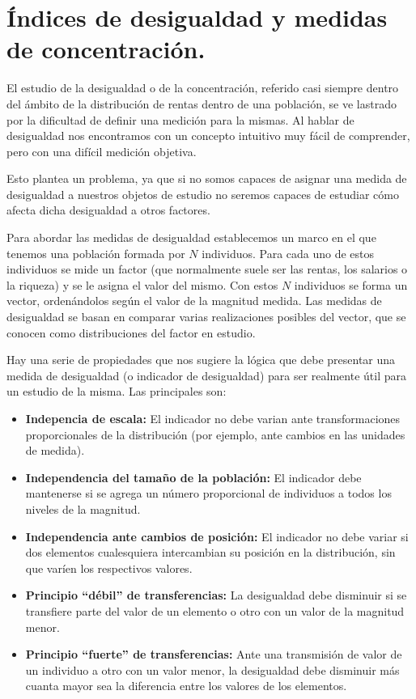 \chapter[\'Indices de desigualdad y medidas de concentraci\'on.]{\'Indices de desigualdad y medidas de concentraci\'on.}


El estudio de la desigualdad o de la concentraci\'on, referido casi siempre dentro del \'ambito de la distribuci\'on de rentas dentro de una poblaci\'on, se ve lastrado por la dificultad de definir una medici\'on para la mismas. Al hablar de desigualdad nos encontramos con un concepto intuitivo muy f\'acil de comprender, pero con una dif\'icil medici\'on objetiva.

Esto plantea un problema, ya que si no somos capaces de asignar una medida de desigualdad a nuestros objetos de estudio no seremos capaces de estudiar c\'omo afecta dicha desigualdad a otros factores.


Para abordar las medidas de desigualdad establecemos un marco en el que tenemos una poblaci\'on formada por $N$ individuos. Para cada uno de estos individuos se mide un factor (que normalmente suele ser las rentas, los salarios o la riqueza) y se le asigna el valor del mismo. Con estos $N$ individuos se forma un vector, orden\'andolos seg\'un el valor de la magnitud medida. Las medidas de desigualdad se basan en comparar varias realizaciones posibles del vector, que se conocen como distribuciones del factor en estudio.


Hay una serie de propiedades que nos sugiere la l\'ogica que debe presentar una medida de desigualdad (o indicador de desigualdad) para ser realmente \'util para un estudio de la misma. Las principales son:
\begin{itemize}
\item \textbf{Indepencia de escala:} El indicador no debe varian ante transformaciones proporcionales de la distribuci\'on (por ejemplo, ante cambios en las unidades de medida).
\item \textbf{Independencia del tama\~no de la poblaci\'on:} El indicador debe mantenerse si se agrega un n\'umero proporcional de individuos a todos los niveles de la magnitud.
\item \textbf{Independencia ante cambios de posici\'on:} El indicador no debe variar si dos elementos cualesquiera intercambian su posici\'on en la distribuci\'on, sin que var\'ien los respectivos valores.
\item \textbf{Principio ``d\'ebil'' de transferencias:} La desigualdad debe disminuir si se transfiere parte del valor de un elemento o otro con un valor de la magnitud menor.
\item \textbf{Principio ``fuerte'' de transferencias:} Ante una transmisi\'on de valor de un individuo a otro con un valor menor, la desigualdad debe disminuir m\'as cuanta mayor sea la diferencia entre los valores de los elementos.

\end{itemize}



